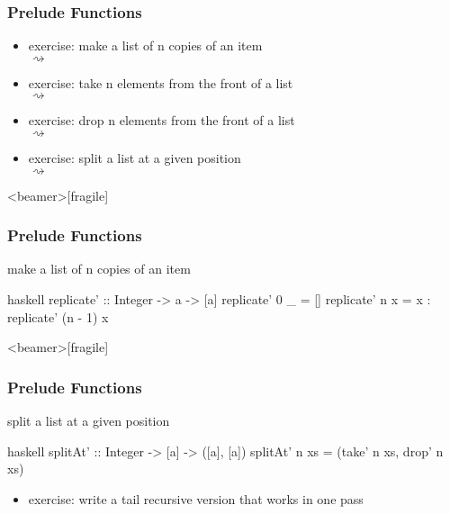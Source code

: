 \documentclass[dvipsnames]{beamer}
\theoremstyle{plain}
\begin{document}
\begin{frame}
  \frametitle{Prelude Functions}

  \begin{itemize}
    \item exercise: make a list of n copies of an item\\
       $\rightsquigarrow$
    \item exercise: take n elements from the front of a list\\
       $\rightsquigarrow$
    \item exercise: drop n elements from the front of a list\\
       $\rightsquigarrow$
    \item exercise: split a list at a given position\\
       $\rightsquigarrow$
  \end{itemize}
\end{frame}

\begin{frame}<beamer>[fragile]
  \frametitle{Prelude Functions}

  \begin{exampleblock}{make a list of n copies of an item}
    \begin{pygments}{haskell}
replicate' :: Integer -> a -> [a]
replicate' 0 _ = []
replicate' n x = x : replicate' (n - 1) x
    \end{pygments}
  \end{exampleblock}
\end{frame}

\begin{frame}<beamer>[fragile]
  \frametitle{Prelude Functions}

  \begin{exampleblock}{split a list at a given position}
    \begin{pygments}{haskell}
splitAt' :: Integer -> [a] -> ([a], [a])
splitAt' n xs = (take' n xs, drop' n xs)
    \end{pygments}
  \end{exampleblock}

  \pause
  \begin{itemize}
    \item exercise: write a tail recursive version that works in one pass
  \end{itemize}
\end{frame}
\end{document}
